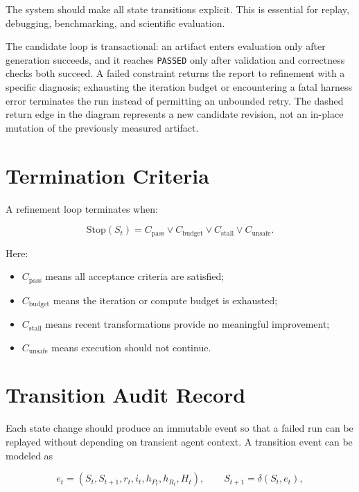 \documentclass[11pt,a4paper,oneside]{report}
\begin{document}
The system should make all state transitions explicit. This is essential for replay, debugging,
benchmarking, and scientific evaluation.

The candidate loop is transactional: an artifact enters evaluation only after generation succeeds,
and it reaches \texttt{PASSED} only after validation and correctness checks both succeed. A failed
constraint returns the report to refinement with a specific diagnosis; exhausting the iteration
budget or encountering a fatal harness error terminates the run instead of permitting an unbounded
retry. The dashed return edge in the diagram represents a new candidate revision, not an in-place
mutation of the previously measured artifact.

\section{Termination Criteria}

A refinement loop terminates when:

\begin{equation}
\mathrm{Stop}(S_t)=
C_{\mathrm{pass}}
\lor
C_{\mathrm{budget}}
\lor
C_{\mathrm{stall}}
\lor
C_{\mathrm{unsafe}}.
\end{equation}

Here:

\begin{itemize}
  \item $C_{\mathrm{pass}}$ means all acceptance criteria are satisfied;
  \item $C_{\mathrm{budget}}$ means the iteration or compute budget is exhausted;
  \item $C_{\mathrm{stall}}$ means recent transformations provide no meaningful improvement;
  \item $C_{\mathrm{unsafe}}$ means execution should not continue.
\end{itemize}

\section{Transition Audit Record}

Each state change should produce an immutable event so that a failed run can be replayed without
depending on transient agent context. A transition event can be modeled as

\begin{equation}
e_t=(S_t,S_{t+1},r_t,i_t,h_{P_t},h_{R_t},H_t),
\qquad
S_{t+1}=\delta(S_t,e_t),
\end{equation}
\end{document}
